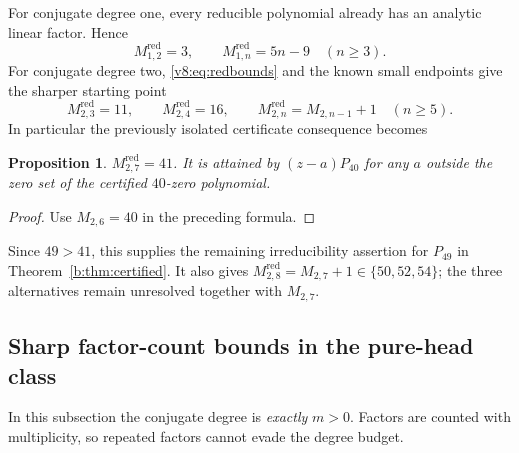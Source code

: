\documentclass[UTF8,11pt]{ctexart}
\newtheorem{prop}[thm]{Proposition}
\theoremstyle{definition}
\numberwithin{equation}{section}
\begin{document}
For conjugate degree one, every reducible polynomial already has
an analytic linear factor. Hence
\[
 M^{\mathrm{red}}_{1,2}=3,\qquad
 M^{\mathrm{red}}_{1,n}=5n-9\quad(n\ge3).
\]
For conjugate degree two, \eqref{v8:eq:redbounds} and the known
small endpoints give the sharper starting point
\[
 M^{\mathrm{red}}_{2,3}=11,\qquad
 M^{\mathrm{red}}_{2,4}=16,\qquad
 M^{\mathrm{red}}_{2,n}=M_{2,n-1}+1\quad(n\ge5).
\]
In particular the previously isolated certificate consequence becomes
\begin{prop}\label{b:prop:reducible}
$M^{\mathrm{red}}_{2,7}=41$. It is attained by $(z-a)P_{40}$ for
any $a$ outside the zero set of the certified $40$-zero polynomial.
\end{prop}
\begin{proof}
Use $M_{2,6}=40$ in the preceding formula.
\end{proof}
Since $49>41$, this supplies the remaining irreducibility assertion
for $P_{49}$ in Theorem~\ref{b:thm:certified}. It also gives
$M^{\mathrm{red}}_{2,8}=M_{2,7}+1\in\{50,52,54\}$;
the three alternatives remain unresolved together with $M_{2,7}$.

\subsection{Sharp factor-count bounds in the pure-head class}

In this subsection the conjugate degree is \emph{exactly} $m>0$.
Factors are counted with multiplicity, so repeated factors cannot
evade the degree budget.
\end{document}
